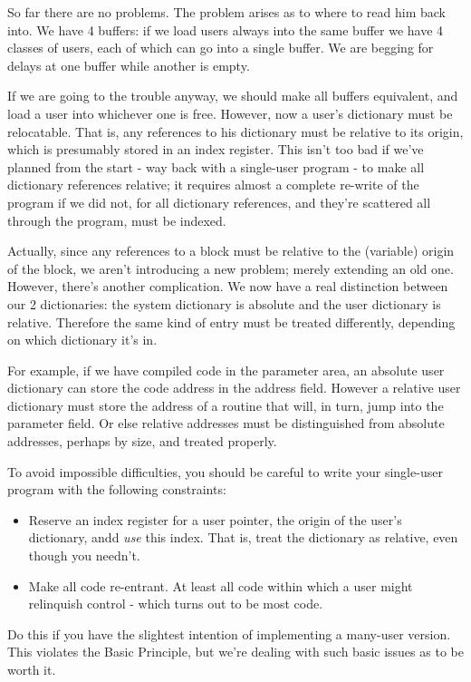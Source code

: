 \documentclass[b5paper, oneside]{book}
\begin{document}
So far there are no problems. The problem arises as to where to read him back into. We have 4 buffers: if we load users always into the same buffer we have 4 classes of users, each of which can go into a single buffer. We are begging for delays at one buffer while another is empty.

If we are going to the trouble anyway, we should make all buffers equivalent, and load a user into whichever one is free. However, now a user's dictionary must be relocatable. That is, any references to his dictionary must be relative to its origin, which is presumably stored in an index register.
This isn't too bad if we've planned from the start - way back with a single-user program - to make all dictionary references relative; it requires almost a complete re-write of the program if we did not, for all dictionary references, and they're scattered all through the program, must be indexed.

Actually, since any references to a block must be relative to the (variable) origin of the block, we aren't introducing a new problem; merely extending an old one. However, there's another complication. We now have a real distinction between our 2 dictionaries: the system dictionary is absolute and the user dictionary is relative. Therefore the same kind of entry must be treated differently, depending on which dictionary it's in.

For example, if we have compiled code in the parameter area, an absolute user dictionary can store the code address in the address field. However a relative user dictionary must store the address of a routine that will, in turn, jump into the parameter field. Or else relative addresses must be distinguished from absolute addresses, perhaps by size, and treated properly.

To avoid impossible difficulties, you should be careful to write your single-user program with the following constraints:\begin{itemize}
   \item Reserve an index register for a user pointer, the origin of the user's dictionary, andd {\em use} this index. That is, treat the dictionary as relative, even though you needn't.
   \item Make all code re-entrant. At least all code within which a user might relinquish control - which turns out to be most code.\end{itemize}
Do this if you have the slightest intention of implementing a many-user version. This violates the Basic Principle, but we're dealing with such basic issues as to be worth it.
\end{document}
